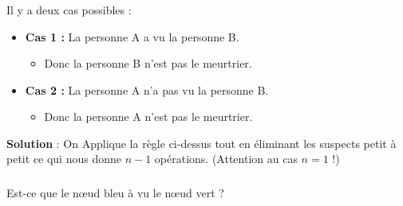 \begin{frame}
    \frametitle{\problemtitle}
    Il y a deux cas possibles :
    \begin{itemize}
        \item<+-> \textbf{Cas 1 :} La personne A a vu la personne B.
            \begin{itemize}
                \item<+-> Donc la personne B n'est pas le meurtrier.
            \end{itemize}
        \item<+-> \textbf{Cas 2 :} La personne A n'a pas vu la personne B.
            \begin{itemize}
                \item<+-> Donc la personne A n'est pas le meurtrier.
            \end{itemize}
    \end{itemize}
    \pause
    \textbf{Solution} : On Applique la règle ci-dessus tout en éliminant les suspects petit à petit ce qui nous donne $n-1$ opérations. (Attention au cas $n = 1$ !)
\end{frame}

\begin{frame}\frametitle{\problemtitle}
    Est-ce que le nœud bleu à vu le nœud vert ?
    \centering
    \begin{figure}%
    \end{figure}
\end{frame}


